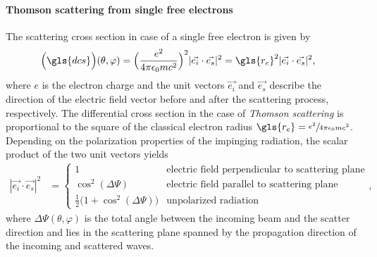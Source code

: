 \paragraph{Thomson scattering from single free electrons}
The scattering cross section in case of a single free electron is given by
\begin{align}
 \Big(\gls{dcs}\Big)(\theta, \varphi) &= \Big(\frac{e^2}{4 \pi \epsilon_0 m c^2}\Big)^2 |\vec{e_i} \cdot \vec{e_s}|^2 = \gls{r_e}^2 |\vec{e_i} \cdot \vec{e_s}|^2 \text{,} \label{ch_theo:eqn_thomson_scattering}
\end{align}
where $e$ is the electron charge and the unit vectors $\vec{e_i}$ and $\vec{e_s}$ describe the direction of the electric field vector before and after the scattering process, respectively. The differential cross section in the case of \emph{Thomson scattering} is proportional to the square of the classical electron radius $\gls{r_e}=\sfrac{e^2}{4 \pi \epsilon_0 m c^2}$. Depending on the polarization properties of the impinging radiation, the scalar product of the two unit vectors yields
\begin{align}
|\vec{e_i} \cdot \vec{e_s}|^2 &= \begin{cases}
    1 & \text{electric field perpendicular to scattering plane} \\
    \cos^2(\Delta \Psi) & \text{electric field parallel to scattering plane} \\
    \frac{1}{2}\big(1+\cos^2(\Delta \Psi)\big) & \text{unpolarized radiation}
\end{cases} \text{,}
\end{align}
where $\Delta \Psi(\theta, \varphi)$ is the total angle between the incoming beam and the scatter direction \cite{als-nielsen_x-rays_2011} and lies in the scattering plane spanned by the propagation direction of the incoming and scattered waves.

